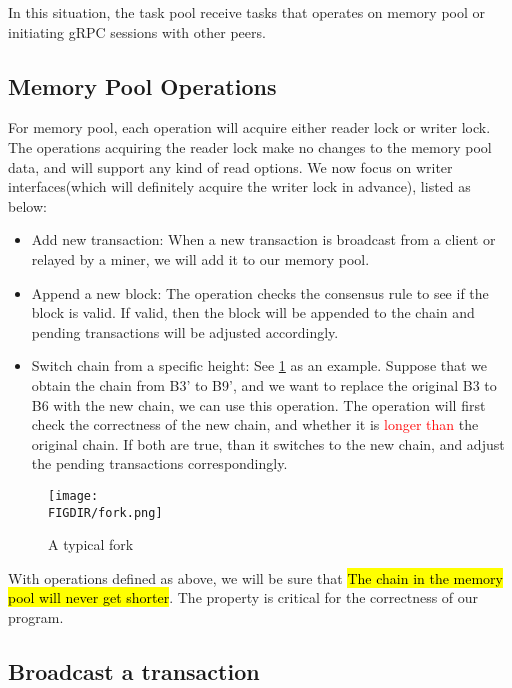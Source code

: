 \documentclass{article}
\begin{document}
\begin{spacing}{1.1}
In this situation, the task pool receive tasks that operates on memory pool or initiating gRPC sessions with other peers.

\subsection{Memory Pool Operations}

For memory pool, each operation will acquire either reader lock or writer lock. The operations acquiring the reader lock make no changes to the memory pool data, and will support any kind of read options. We now focus on writer interfaces(which will definitely acquire the writer lock in advance), listed as below:
\begin{itemize}
    \setlength\itemsep{1pt}
    \item Add new transaction: When a new transaction is broadcast from a client or relayed by a miner, we will add it to our memory pool.
    \item Append a new block: The operation checks the consensus rule to see if the block is valid. If valid, then the block will be appended to the chain and pending transactions will be adjusted accordingly.
    \item Switch chain from a specific height: See \cref{fig:fork} as an example. Suppose that we obtain the chain from B3' to B9', and we want to replace the original B3 to B6 with the new chain, we can use this operation. The operation will first check the correctness of the new chain, and whether it is \textcolor{red}{longer than} the original chain. If both are true, than it switches to the new chain, and adjust the pending transactions correspondingly.
\end{itemize}

\begin{figure}
    \centering
    \texttt{[image: \\FIGDIR/fork.png]}
    \caption{A typical fork}
    \label{fig:fork}
\end{figure}

With operations defined as above, we will be sure that \hl{The chain in the memory pool will never get shorter}. The property is critical for the correctness of our program.

\subsection{Broadcast a transaction}


\end{spacing}
\end{document}
